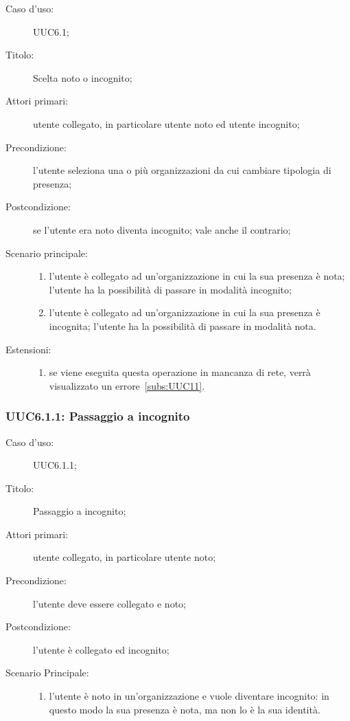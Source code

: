 \documentclass[../../../analisi-dei-requisiti.tex]{subfiles}
\begin{document}
\begin{description}
  \item[Caso d’uso:] UUC6.1;
  \item[Titolo:] Scelta noto o incognito;
  \item[Attori primari:] utente collegato, in particolare utente noto ed utente incognito;
  \item[Precondizione:] l'utente seleziona una o più organizzazioni da cui cambiare tipologia di presenza;
  \item[Postcondizione:] se l'utente era noto diventa incognito; vale anche il contrario;
  \item[Scenario principale:]
        \begin{enumerate}
          \item l'utente è collegato ad un'organizzazione in cui la sua presenza è nota; l'utente ha la possibilità di passare in modalità incognito;
          \item l'utente è collegato ad un'organizzazione in cui la sua presenza è incognita; l'utente ha la possibilità di passare in modalità nota.
        \end{enumerate}
  \item[Estensioni:]
        \begin{enumerate}
          \item se viene eseguita questa operazione in mancanza di rete, verrà visualizzato un errore~\ref{subs:UUC11}.
        \end{enumerate}
\end{description}

\subsubsection{UUC6.1.1: Passaggio a incognito}%
\label{subs:UUC6.1.1}
\begin{description}
  \item[Caso d’uso:] UUC6.1.1;
  \item[Titolo:] Passaggio a incognito;
  \item[Attori primari:] utente collegato, in particolare utente noto;
  \item[Precondizione:] l'utente deve essere collegato e noto;
  \item[Postcondizione:] l'utente è collegato ed incognito;
  \item[Scenario Principale:]
        \begin{enumerate}
          \item l'utente è noto in un'organizzazione e vuole diventare incognito: in questo modo la sua presenza è nota, ma non lo è la sua identità.
        \end{enumerate}
\end{description}
\end{document}
